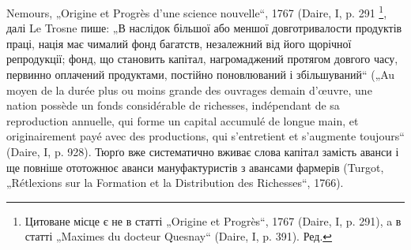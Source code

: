 Nemours, „Origine et Progrès d’une science nouvelle“, 1767 (Daire, I, p. 291 \footnote*{
Цитоване місце є не в статті „Origine et Progrès“, 1767 (Daire, I, p. 291),
a в статті „Maximes du docteur Quesnay“ (Daire, I, p. 391). Ред.
},
далі Le Trosne пише: „В наслідок більшої або меншої довготривалости продуктів
праці, нація має чималий фонд багатств, незалежний від його щорічної
репродукції; фонд, що становить капітал, нагромаджений протягом довгого
часу, первинно оплачений продуктами, постійно поновлюваний і збільшуваний“
(„Au moyen de la durée plus ou moins grande des ouvrages demain d'œuvre, une
nation possède un fonds considérable de richesses, indépendant de sa reproduction
annuelle, qui forme un capital accumulé de longue main, et originairement payé
avec des productions, qui s'entretient et s’augmente toujours“ (Daire, I, p. 928).
Тюрґо вже систематично вживає слова капітал замість аванси і ще повніше ототожнює
аванси мануфактуристів з авансами фармерів (Turgot, „Rétlexions sur la
Formation et la Distribution des Richesses“, 1766).
\parbreak{}  %
